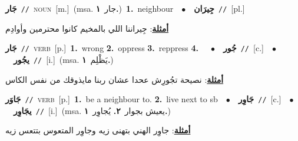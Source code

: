 \documentclass[10pt,a4paper,twoside]{article} %
\begin{document}
\begin{multicols}{2}
{\setlength\topsep{0pt}\textbf{\foreignlanguage{arabic}{جَار}}\ {\color{gray}\texttt{//}\color{black}}\ \textsc{noun}\ [m.]\ \color{gray}(msa. \foreignlanguage{arabic}{جار}~\foreignlanguage{arabic}{\textbf{١.}})\color{black}\ \textbf{1.}~neighbour\ \ $\bullet$\ \ \setlength\topsep{0pt}\textbf{\foreignlanguage{arabic}{جِيرَان}}\ {\color{gray}\texttt{//}\color{black}}\ [pl.]\  \begin{flushright}\color{gray}\foreignlanguage{arabic}{\textbf{\underline{\foreignlanguage{arabic}{أمثلة}}}: جِيراننا اللي بالمخيم كانوا محترمين وأوادِم}\end{flushright}\color{black}} \vspace{2mm}

{\setlength\topsep{0pt}\textbf{\foreignlanguage{arabic}{جَار}}\ {\color{gray}\texttt{//}\color{black}}\ \textsc{verb}\ [p.]\ \textbf{1.}~wrong  \textbf{2.}~oppress  \textbf{3.}~reppress  \textbf{4.}~\ \ $\bullet$\ \ \setlength\topsep{0pt}\textbf{\foreignlanguage{arabic}{جُور}}\ {\color{gray}\texttt{//}\color{black}}\ [c.]\ \ $\bullet$\ \ \setlength\topsep{0pt}\textbf{\foreignlanguage{arabic}{يجُور}}\ {\color{gray}\texttt{//}\color{black}}\ [i.]\ \color{gray}(msa. \foreignlanguage{arabic}{يَظْلِم}~\foreignlanguage{arabic}{\textbf{١.}})\color{black}\  \begin{flushright}\color{gray}\foreignlanguage{arabic}{\textbf{\underline{\foreignlanguage{arabic}{أمثلة}}}: نصيحة تجُورِش عحدا عشان ربنا مايذوقك من نفس الكاس}\end{flushright}\color{black}} \vspace{2mm}

{\setlength\topsep{0pt}\textbf{\foreignlanguage{arabic}{جَاوَر}}\ {\color{gray}\texttt{//}\color{black}}\ \textsc{verb}\ [p.]\ \textbf{1.}~be a neighbour to.  \textbf{2.}~live next to sb\ \ $\bullet$\ \ \setlength\topsep{0pt}\textbf{\foreignlanguage{arabic}{جَاوِر}}\ {\color{gray}\texttt{//}\color{black}}\ [c.]\ \ $\bullet$\ \ \setlength\topsep{0pt}\textbf{\foreignlanguage{arabic}{يجَاوِر}}\ {\color{gray}\texttt{//}\color{black}}\ [i.]\ \color{gray}(msa. \foreignlanguage{arabic}{يعيش بجوار}~\foreignlanguage{arabic}{\textbf{٢.}}  \foreignlanguage{arabic}{يُجاوِر}~\foreignlanguage{arabic}{\textbf{١.}})\color{black}\  \begin{flushright}\color{gray}\foreignlanguage{arabic}{\textbf{\underline{\foreignlanguage{arabic}{أمثلة}}}: جاوِر الهني بتهنى زيه وجاوِر المتعوس بتتعس زيه}\end{flushright}\color{black}} \vspace{2mm}


\end{multicols}
\end{document}
